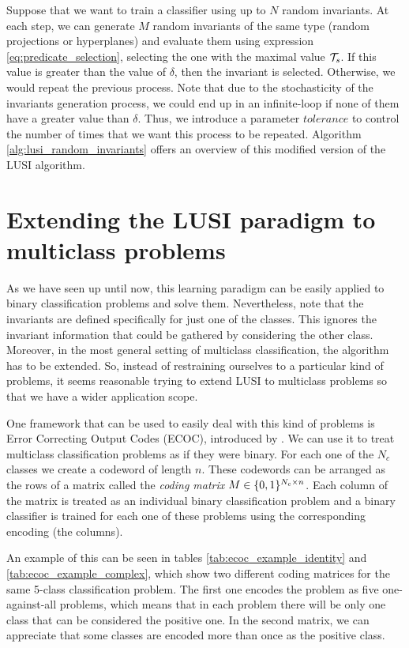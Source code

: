 Suppose that we want to train a classifier using up to $N$ random invariants. At each step, we can generate
$M$ random invariants of the same type (random projections or hyperplanes) and evaluate them
using expression \eqref{eq:predicate_selection}, selecting the one with the maximal value $\mathcal{T}_s$. If this value
is greater than the value of $\delta$, then the invariant is selected. Otherwise, we would repeat
the previous process. Note that due to the stochasticity of the invariants generation process, we could end up
in an infinite-loop if none of them have a greater value than $\delta$. Thus, we introduce a parameter
$tolerance$ to control the number of times that we want this process to be repeated. Algorithm \ref{alg:lusi_random_invariants} offers an overview of this modified version of the LUSI
algorithm.

\section{Extending the LUSI paradigm to multiclass problems}

As we have seen up until now, this learning paradigm can be easily applied to binary classification problems
and solve them. Nevertheless, note that the invariants are defined specifically for just one of the classes.
This ignores the invariant information that could be gathered by considering the other class. Moreover, in
the most general setting of multiclass classification, the algorithm has to be extended. So, instead of
restraining ourselves to a particular kind of problems, it seems reasonable trying to extend
LUSI to multiclass problems so that we have a wider application scope.

One framework that can be used to easily deal with this kind of problems is Error Correcting Output Codes (ECOC),
introduced by \cite{DietrichBakiri1995}. We can use it to treat multiclass classification problems as if they
were binary. For each one of the $N_c$ classes we create a codeword of length $n$. These codewords can be arranged as
the rows of a matrix called the \emph{coding matrix} $M \in \lbrace 0, 1 \rbrace^{N_c \times n}$. Each column of the matrix
is treated as an individual binary classification problem and a binary classifier is trained for each one of these
problems using the corresponding encoding (the columns).

An example of this can be seen in tables \ref{tab:ecoc_example_identity} and \ref{tab:ecoc_example_complex},
which show two different coding matrices for the same 5-class classification problem. The first one encodes the
problem as five one-against-all problems, which means that in each problem there will be only one class that can be
considered the positive one. In the second matrix, we can appreciate that some classes are encoded more than
once as the positive class.

